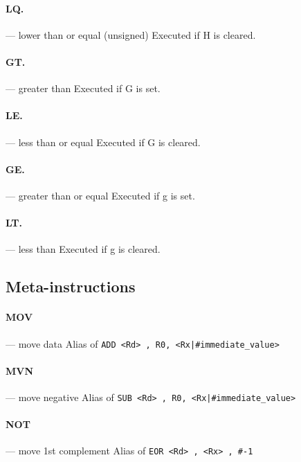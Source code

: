 \documentclass[11pt]{article}
\begin{document}
\paragraph{LQ.} --- lower than or equal (unsigned)\newline
Executed if H is cleared. 

\paragraph{GT.} --- greater than\newline
Executed if G is set. 

\paragraph{LE.} --- less than or equal\newline
Executed if G is cleared. 

\paragraph{GE.} --- greater than or equal\newline
Executed if g is set. 

\paragraph{LT.} --- less than\newline
Executed if g is cleared. 

\subsection{Meta-instructions}

\paragraph{MOV} --- move data\newline
Alias of \texttt{ADD <Rd> , R0, <Rx|\#immediate\_value> }

\paragraph{MVN} --- move negative\newline
Alias of \texttt{SUB <Rd> , R0, <Rx|\#immediate\_value> }

\paragraph{NOT} --- move 1st complement\newline
Alias of \texttt{EOR <Rd> , <Rx> , \#-1}
\end{document}
